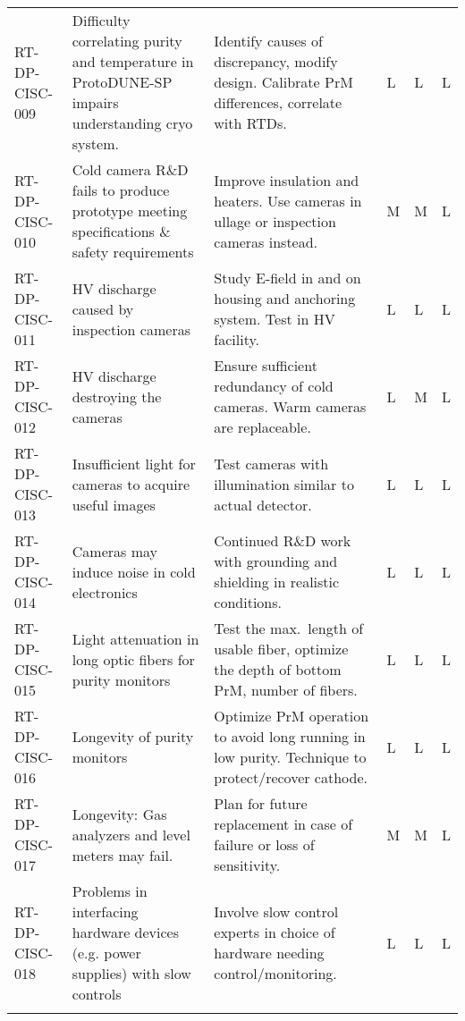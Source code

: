 \begin{footnotesize}
\begin{longtable}{P{0.18\textwidth}P{0.20\textwidth}P{0.32\textwidth}P{0.02\textwidth}P{0.02\textwidth}P{0.02\textwidth}}
RT-DP-CISC-009 & Difficulty correlating purity and temperature in ProtoDUNE-SP impairs understanding cryo system. & Identify causes of discrepancy, modify design. Calibrate PrM differences, correlate with RTDs. & L & L & L \\  \colhline
RT-DP-CISC-010 & Cold camera R\&D fails to produce prototype meeting specifications \& safety requirements & Improve insulation and heaters. Use cameras in ullage or inspection cameras instead. & M & M & L \\  \colhline
RT-DP-CISC-011 & HV discharge caused by inspection cameras & Study E-field in and on housing and anchoring system. Test in HV facility. & L & L & L \\  \colhline
RT-DP-CISC-012 & HV discharge destroying the cameras & Ensure sufficient redundancy of cold cameras. Warm cameras are replaceable. & L & M & L \\  \colhline
RT-DP-CISC-013 & Insufficient light for cameras to acquire useful images & Test cameras with illumination similar to actual detector. & L & L & L \\  \colhline
RT-DP-CISC-014 & Cameras may induce noise in cold electronics & Continued R\&D work with grounding and shielding in realistic conditions. & L & L & L \\  \colhline
RT-DP-CISC-015 & Light attenuation in long optic fibers for purity monitors  & Test the max.\ length of usable fiber, optimize the depth of bottom PrM, number of fibers. & L & L & L \\  \colhline
RT-DP-CISC-016 & Longevity of purity monitors & Optimize PrM operation to avoid long running in low purity. Technique to protect/recover cathode. & L & L & L \\  \colhline
RT-DP-CISC-017 & Longevity: Gas analyzers and level meters may fail. & Plan for future replacement in case of failure or loss of sensitivity.  & M & M & L \\  \colhline
RT-DP-CISC-018 & Problems in interfacing  hardware devices (e.g. power supplies) with slow controls & Involve slow control experts in choice of hardware needing control/monitoring.
 & L & L & L \\  \colhline

\label{tab:risks:DP-FD-CISC}
\end{longtable}
\end{footnotesize}
